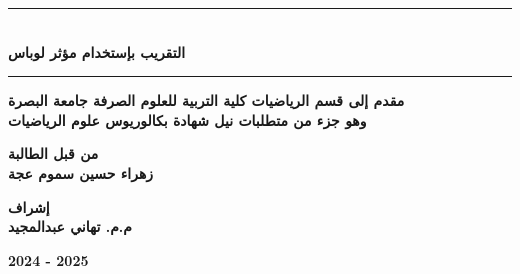 \begin{titlepage}
	\vspace{1cm}
	
	\begin{center}
		\rule{100mm}{0.5mm}\\
		\vspace{1cm}
		\large \textbf{التقريب بإستخدام مؤثر لوباس}\\
		\vspace{12pt}
		\rule{100mm}{0.5mm}
	\end{center}
	\vfill
	\begin{center}
		\large
		\textbf{مقدم إلى قسم الرياضيات كلية التربية للعلوم الصرفة جامعة البصرة\\
			\vspace{6pt}
			وهو جزء من متطلبات نيل شهادة بكالوريوس علوم الرياضيات}
	\end{center}
	\vfill
	\begin{center}
		\large
		\textbf{من قبل الطالبة}\\
		\vspace{8pt}
		 \large
		\textbf{زهراء حسين سموم عجة}
	\end{center}
	\vspace{10pt}
	\begin{center}
		\large
		\textbf{إشراف}\\
		\vspace{8pt}
		 \large
		\textbf{م.م. تهاني عبدالمجيد}
	\end{center}
	\vspace{10pt}
	\begin{center}
		\large 
		\textbf{2024 - 2025}
	\end{center}
\end{titlepage}
